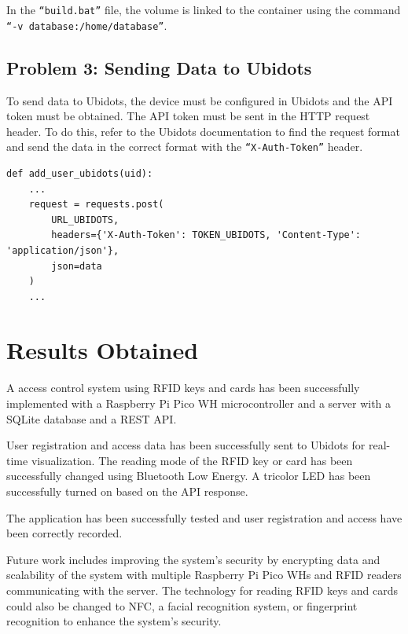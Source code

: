 \documentclass{article}
\begin{document}
In the \texttt{``build.bat''} file, the volume is linked to the container using the command \texttt{``-v database:/home/database''}.

\subsection{Problem 3: Sending Data to Ubidots}

To send data to Ubidots, the device must be configured in Ubidots and the API token must be obtained. The API token must be sent in the HTTP request header. To do this, refer to the Ubidots documentation to find the request format and send the data in the correct format with the \texttt{``X-Auth-Token''} header.

\begin{lstlisting}
def add_user_ubidots(uid):
    ...
    request = requests.post(
        URL_UBIDOTS,
        headers={'X-Auth-Token': TOKEN_UBIDOTS, 'Content-Type': 'application/json'},
        json=data
    )
    ...
\end{lstlisting}


\section{Results Obtained}

A access control system using RFID keys and cards has been successfully implemented with a Raspberry Pi Pico WH microcontroller and a server with a SQLite database and a REST API. 

User registration and access data has been successfully sent to Ubidots for real-time visualization. The reading mode of the RFID key or card has been successfully changed using Bluetooth Low Energy. A tricolor LED has been successfully turned on based on the API response. 

The application has been successfully tested and user registration and access have been correctly recorded. 

Future work includes improving the system's security by encrypting data and scalability of the system with multiple Raspberry Pi Pico WHs and RFID readers communicating with the server. The technology for reading RFID keys and cards could also be changed to NFC, a facial recognition system, or fingerprint recognition to enhance the system's security.



\end{document}
